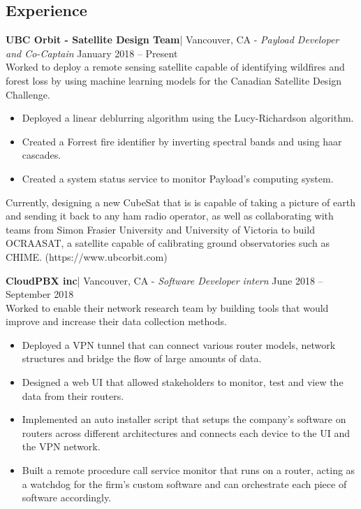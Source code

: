 \documentclass[letter]{res}
\begin{document}
\begin{resume}
\section{Experience}
\textbf{UBC Orbit - Satellite Design Team}| Vancouver, CA\newline 
 - {\sl Payload Developer and Co-Captain} \hfill January 2018 – Present\\
 Worked to deploy a remote sensing satellite capable of identifying wildfires and forest loss by using machine learning models for the Canadian Satellite Design Challenge.\\
 \vspace{-2mm}
 \begin{itemize}
 \item Deployed a linear deblurring algorithm using the Lucy-Richardson algorithm.
 \item Created a Forrest fire identifier by inverting spectral bands and using haar cascades. 
 \item Created a system status service to monitor Payload's computing system. 
 \end{itemize}
 Currently, designing a new CubeSat that is is capable of taking a picture of earth and sending it back to any ham radio operator, as well as collaborating with teams from Simon Frasier University and University of Victoria to build OCRAASAT, a satellite capable of calibrating ground observatories such as CHIME. (https://www.ubcorbit.com)

\textbf{CloudPBX inc}| Vancouver, CA \newline 
 - {\sl Software Developer intern} \hfill June 2018 – September 2018\\
Worked to enable their network research team by building tools that would improve and increase their data collection methods. \\
 \vspace{-2mm}
 \begin{itemize}
 \item Deployed a VPN tunnel that can connect various router models, network structures and bridge the flow of large amounts of data.
 \item Designed a web UI that allowed stakeholders to monitor, test and view the data from their routers.
 \item Implemented an auto installer script that setups the company's software on routers across different architectures and connects each device to the UI and the VPN network.
 \item Built a remote procedure call service monitor that runs on a router, acting as a watchdog for the firm's custom software and can orchestrate each piece of software accordingly.
 \end{itemize}


\end{resume}
\end{document}
